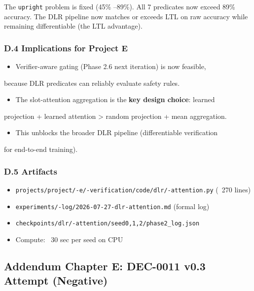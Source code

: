 \documentclass[11pt]{article}
\begin{document}
The \texttt{upright} problem is fixed (45\% --89\%). All 7 predicates now exceed
89\% accuracy. The DLR pipeline now matches or exceeds LTL on raw accuracy
while remaining differentiable (the LTL advantage).

\subsubsection{D.4 Implications for Project E}

\begin{itemize}
  \item Verifier-aware gating (Phase 2.6 next iteration) is now feasible,
\end{itemize}

  because DLR predicates can reliably evaluate safety rules.
\begin{itemize}
  \item The slot-attention aggregation is the \textbf{key design choice}: learned
\end{itemize}

  projection + learned attention > random projection + mean aggregation.
\begin{itemize}
  \item This unblocks the broader DLR pipeline (differentiable verification
\end{itemize}

  for end-to-end training).

\subsubsection{D.5 Artifacts}

\begin{itemize}
  \item \texttt{projects/project/-e/-verification/code/dlr/-attention.py} (~270 lines)
  \item \texttt{experiments/-log/2026-07-27-dlr-attention.md} (formal log)
  \item \texttt{checkpoints/dlr/-attention/seed{0,1,2}/phase2\_log.json}
  \item Compute: ~30 sec per seed on CPU
\end{itemize}


\hrulefill

\subsection{Addendum Chapter E: DEC-0011 v0.3 Attempt (Negative)}
\end{document}
